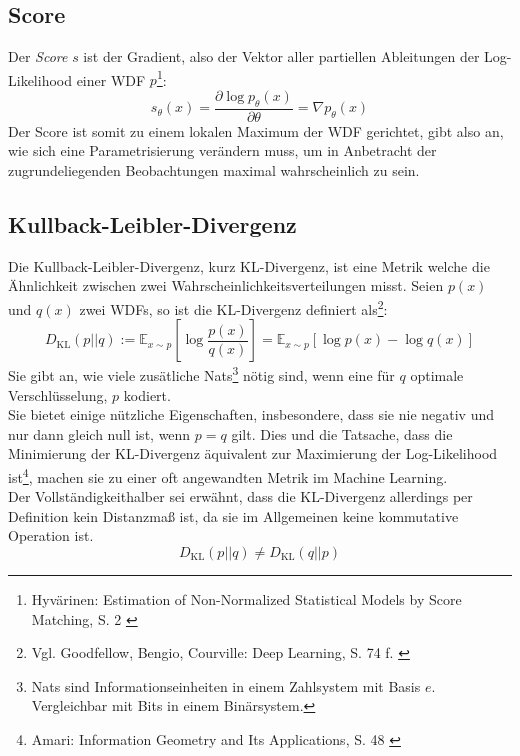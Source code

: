 \subsection{Score}

Der \textit{Score} $s$ ist der Gradient, also der Vektor aller partiellen Ableitungen der Log-Likelihood einer \ac{WDF} $p$\footnote{
    Hyvärinen: Estimation of Non-Normalized Statistical Models by Score Matching, S. 2
    \cite{JMLR:v6:hyvarinen05a}
}: 
\begin{equation}
    s_\theta(x) = \frac{\partial \log p_\theta(x)}{\partial \theta} 
    = \nabla p_\theta(x)
\end{equation}
Der Score ist somit zu einem lokalen Maximum der \ac{WDF} gerichtet, gibt also an, wie sich eine Parametrisierung verändern muss, um in Anbetracht der zugrundeliegenden Beobachtungen maximal wahrscheinlich zu sein.

\subsection{Kullback-Leibler-Divergenz}

Die Kullback-Leibler-Divergenz, kurz KL-Divergenz, ist eine Metrik welche die Ähnlichkeit zwischen zwei Wahrscheinlichkeitsverteilungen misst. Seien $p(x)$ und $q(x)$ zwei \ac{WDF}s, so ist die KL-Divergenz definiert als\footnote{
    Vgl. Goodfellow, Bengio, Courville: Deep Learning, S. 74 f.
    \cite{Goodfellow-et-al-2016}
}:
\begin{equation}
    D_\text{KL}(p||q) 
    := \mathbb{E}_{x \sim p} \left [
    \log \frac{p(x)} {q(x)}
    \right ]
    = \mathbb{E}_{x \sim p} \left [ 
        \log p(x) - \log q(x)
        \right ]
\end{equation}
Sie gibt an, wie viele zusätliche Nats\footnote{
    Nats sind Informationseinheiten in einem Zahlsystem mit Basis $e$. Vergleichbar mit Bits in einem Binärsystem. 
} nötig sind, wenn eine für $q$ optimale Verschlüsselung, $p$ kodiert. \\
Sie bietet einige nützliche Eigenschaften, insbesondere, dass sie nie negativ und nur dann gleich null ist, wenn $p = q$ gilt. Dies und die Tatsache, dass die Minimierung der KL-Divergenz äquivalent zur Maximierung der Log-Likelihood ist\footnote{
    Amari: Information Geometry and Its Applications, S. 48
    \cite{10.5555/3019383}
}, machen sie zu einer oft angewandten Metrik im Machine Learning. \\
Der Vollständigkeithalber sei erwähnt, dass die KL-Divergenz allerdings per Definition kein Distanzmaß ist, da sie im Allgemeinen keine kommutative Operation ist.  
\begin{equation}
    D_\text{KL}(p||q) \ne D_\text{KL}(q||p) 
\end{equation}


